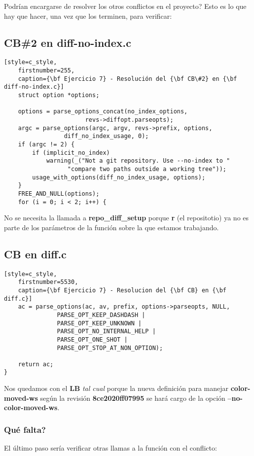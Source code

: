 Podrían encargarse de resolver los otros conflictos en el proyecto? Esto es lo que hay que hacer, una vez que los terminen, para verificar:

\subsection*{CB\#2 en diff-no-index.c}
\begin{lstlisting}[style=c_style,
	firstnumber=255,
	caption={\bf Ejercicio 7} - Resolución del {\bf CB\#2} en {\bf diff-no-index.c}]
	struct option *options;

	options = parse_options_concat(no_index_options,
				       revs->diffopt.parseopts);
	argc = parse_options(argc, argv, revs->prefix, options,
			     diff_no_index_usage, 0);
	if (argc != 2) {
		if (implicit_no_index)
			warning(_("Not a git repository. Use --no-index to "
				  "compare two paths outside a working tree"));
		usage_with_options(diff_no_index_usage, options);
	}
	FREE_AND_NULL(options);
	for (i = 0; i < 2; i++) {
\end{lstlisting}

No se necesita la llamada a {\bf repo\_diff\_setup} porque {\bf r} (el repositotio) ya no es parte de los parámetros
de la función sobre la que estamos trabajando.

\subsection*{CB en diff.c}

\begin{lstlisting}[style=c_style,
	firstnumber=5530,
	caption={\bf Ejercicio 7} - Resolucion del {\bf CB} en {\bf diff.c}]
	ac = parse_options(ac, av, prefix, options->parseopts, NULL,
			   PARSE_OPT_KEEP_DASHDASH |
			   PARSE_OPT_KEEP_UNKNOWN |
			   PARSE_OPT_NO_INTERNAL_HELP |
			   PARSE_OPT_ONE_SHOT |
			   PARSE_OPT_STOP_AT_NON_OPTION);

	return ac;
}
\end{lstlisting}

Nos quedamos con el {\bf LB} {\it tal cual} porque la nueva definición para manejar {\bf color-moved-ws} según la revisión {\bf 8ce2020ff07995}
se hará cargo de la opción {\bf --no-color-moved-ws}.

\subsubsection{Qué falta?}
El último paso sería verificar otras llamas a la función con el conflicto:

